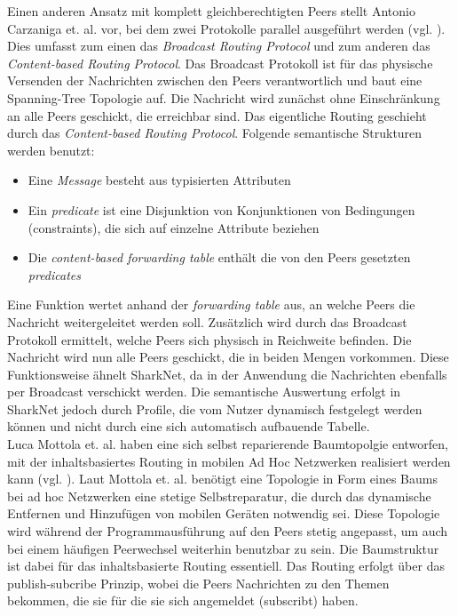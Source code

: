 Einen anderen Ansatz mit komplett gleichberechtigten Peers stellt Antonio Carzaniga et. al. vor, bei dem zwei Protokolle parallel ausgeführt werden (vgl. \citet[S. 918ff]{Carzaniga2004}). Dies umfasst zum einen das \textit{Broadcast Routing Protocol} und zum anderen das \textit{Content-based Routing Protocol}. Das Broadcast Protokoll ist für das physische Versenden der Nachrichten zwischen den Peers verantwortlich und baut eine Spanning-Tree Topologie auf. Die Nachricht wird zunächst ohne Einschränkung an alle Peers geschickt, die erreichbar sind. Das eigentliche Routing geschieht durch das \textit{Content-based Routing Protocol}. Folgende semantische Strukturen werden benutzt:
\begin{itemize}
	\item Eine \textit{Message} besteht aus typisierten Attributen
	\item Ein \textit{predicate} ist eine Disjunktion von Konjunktionen von Bedingungen (constraints), die sich auf einzelne Attribute beziehen
	\item Die \textit{content-based forwarding table} enthält die von den Peers gesetzten \textit{predicates} 	
\end{itemize}
Eine Funktion wertet anhand der \textit{forwarding table} aus, an welche Peers die Nachricht weitergeleitet werden soll. Zusätzlich wird durch das Broadcast Protokoll ermittelt, welche Peers sich physisch in Reichweite befinden. Die Nachricht wird nun alle Peers geschickt, die in beiden Mengen vorkommen. Diese Funktionsweise ähnelt SharkNet, da in der Anwendung die Nachrichten ebenfalls per Broadcast verschickt werden. Die semantische Auswertung erfolgt in SharkNet jedoch durch Profile, die vom Nutzer dynamisch festgelegt werden können und nicht durch eine sich automatisch aufbauende Tabelle. 
\\Luca Mottola et. al. haben eine sich selbst reparierende Baumtopolgie entworfen, mit der inhaltsbasiertes Routing in mobilen Ad Hoc Netzwerken realisiert werden kann (vgl. \citet[S. 946ff]{Mottola2008}). Laut Mottola et. al. benötigt eine Topologie in Form eines Baums bei ad hoc Netzwerken eine stetige Selbstreparatur, die durch das dynamische Entfernen und Hinzufügen von mobilen Geräten notwendig sei. Diese Topologie wird während der Programmausführung auf den Peers stetig angepasst, um auch bei einem häufigen Peerwechsel weiterhin benutzbar zu sein. Die Baumstruktur ist dabei für das inhaltsbasierte Routing essentiell. Das Routing erfolgt über das publish-subcribe Prinzip, wobei die Peers Nachrichten zu den Themen bekommen, die sie für die sie sich angemeldet (subscribt) haben. 
